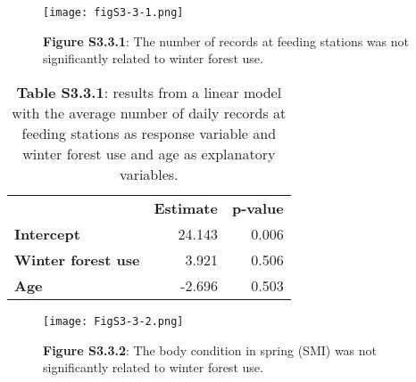 \documentclass[10pt, twoside]{book} %
\begin{document}
\begin{figure}[h]
	\begin{center}
		\texttt{[image: figS3-3-1.png]}
	\end{center}
	\caption*{\textbf{Figure S3.3.1}: The number of records at feeding stations was not significantly related to winter forest use.}
\end{figure}


\begin{table}[h!]
	\begin{center}
		\begin{footnotesize}
			\caption*{\textbf{Table S3.3.1}: results from a linear model with the average number of daily records at feeding stations as response variable and winter forest use and age as explanatory variables.}
			
			\begingroup
			\setlength{\tabcolsep}{8pt} %
			\renewcommand{\arraystretch}{1.5} %
			\begin{tabular}{p{4cm} r r}
				
				\toprule
				& \textbf{Estimate} & \textbf{p-value}\\
				\cmidrule{2-3}
				\textbf{Intercept} & 24.143 & 0.006\\
				\textbf{Winter forest use} & 3.921 & 0.506\\
				\textbf{Age} & -2.696 & 0.503\\
				\bottomrule
			\end{tabular}\endgroup
		\end{footnotesize}
	\end{center}
\end{table}


\begin{figure}[t]
	\begin{center}
		\texttt{[image: FigS3-3-2.png]}
	\end{center}
	\caption*{\textbf{Figure S3.3.2}: The body condition in spring (SMI) was not significantly related to winter forest use.}
\end{figure}
\end{document}

